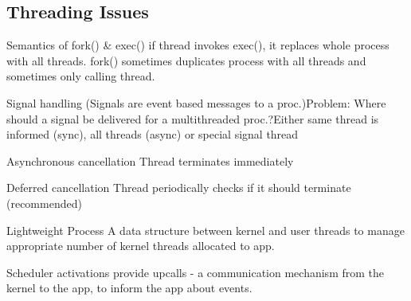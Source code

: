 \subsection*{Threading Issues}
\begin{definition}
\item[Semantics of fork() \& exec()] if thread invokes exec(), it replaces whole process with all threads. fork() sometimes duplicates process with all threads and sometimes only calling thread.
  \item[Signal handling] (Signals are event based messages to a proc.)Problem: Where should a signal be delivered for a multithreaded proc.?Either same thread is informed (sync), all threads (async) or special signal thread
  \item[Asynchronous cancellation] Thread terminates immediately
  \item[Deferred cancellation] Thread periodically checks if it should terminate (recommended)
  \item[Lightweight Process] A data structure between kernel and user threads to manage appropriate number of kernel threads allocated to app.
  \item[Scheduler activations] provide upcalls - a communication mechanism from the kernel to the app, to inform the app about events.
\end{definition}
